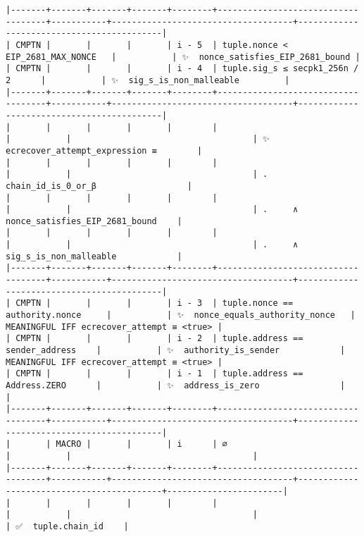 \documentclass[varwidth=\maxdimen,margin=0.5cm,multi={verbatim}]{standalone}
\begin{document}
\begin{verbatim}
|-------+-------+-------+-------+--------+------------------------------------+-----------+------------------------------------+-------------------------------------------|
| CMPTN |       |       |       | i - 5  | tuple.nonce < EIP_2681_MAX_NONCE   |           | ✨  nonce_satisfies_EIP_2681_bound |
| CMPTN |       |       |       | i - 4  | tuple.sig_s ≤ secpk1_256n / 2      |           | ✨  sig_s_is_non_malleable         |
|-------+-------+-------+-------+--------+------------------------------------+-----------+------------------------------------+-------------------------------------------|
|       |       |       |       |        |                                    |           |                                    | ✨  ecrecover_attempt_expression ≡        |
|       |       |       |       |        |                                    |           |                                    | .     chain_id_is_0_or_β                  |
|       |       |       |       |        |                                    |           |                                    | .     ∧ nonce_satisfies_EIP_2681_bound    |
|       |       |       |       |        |                                    |           |                                    | .     ∧ sig_s_is_non_malleable            |
|-------+-------+-------+-------+--------+------------------------------------+-----------+------------------------------------+-------------------------------------------|
| CMPTN |       |       |       | i - 3  | tuple.nonce == authority.nonce     |           | ✨  nonce_equals_authority_nonce   | MEANINGFUL IFF ecrecover_attempt ≡ <true> |
| CMPTN |       |       |       | i - 2  | tuple.address == sender_address    |           | ✨  authority_is_sender            | MEANINGFUL IFF ecrecover_attempt ≡ <true> |
| CMPTN |       |       |       | i - 1  | tuple.address == Address.ZERO      |           | ✨  address_is_zero                |                                           |
|-------+-------+-------+-------+--------+------------------------------------+-----------+------------------------------------+-------------------------------------------|
|       | MACRO |       |       | i      | ∅                                  |           |                                    |
|-------+-------+-------+-------+--------+------------------------------------+-----------+------------------------------------+-------------------------------------------+-----------------------|
|       |       |       |       |        |                                    |           |                                    |                                           | ✅  tuple.chain_id    |

\end{verbatim}
\end{document}
